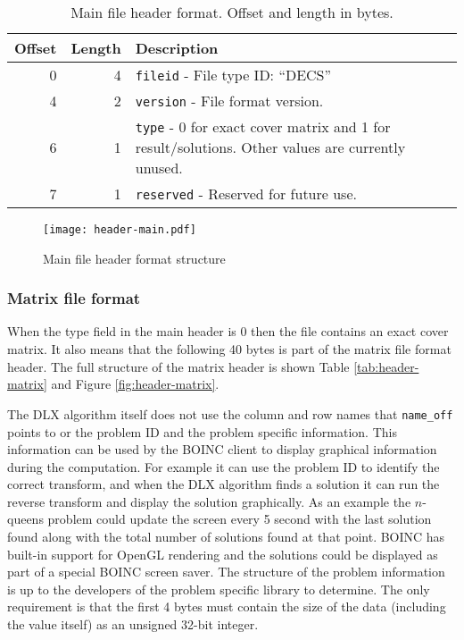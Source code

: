 
\begin{table}[htbp]
	\centering
	\begin{tabular}{|r|r|p{3.2in}|}
		\hline
		\bf Offset & \bf Length & \bf Description \\ \hline
		0  & 4 & \texttt{fileid} - File type ID: ``DECS'' \\ \hline
		4  & 2 & \texttt{version} - File format version. \\ \hline
		6  & 1 & \texttt{type} - 0 for exact cover matrix and 1 for result/solutions. Other values are currently unused. \\ \hline
		7  & 1 & \texttt{reserved} - Reserved for future use. \\ \hline
	\end{tabular}
	\caption{Main file header format. Offset and length in bytes.}
	\label{tab:header-main}
\end{table}

\begin{figure}[htbp]
	\centering
	\texttt{[image: header-main.pdf]}
	\caption{Main file header format structure}
	\label{fig:header-main}
\end{figure}


\subsubsection{Matrix file format}

When the type field in the main header is 0 then the file contains an exact cover matrix.
It also means that the following 40 bytes is part of the matrix file format header.
The full structure of the matrix header is shown Table \ref{tab:header-matrix} and Figure \ref{fig:header-matrix}.

The DLX algorithm itself does not use the column and row names that \texttt{name\_off} points to or the problem ID and the problem specific information.
This information can be used by the BOINC client to display graphical information during the computation.
For example it can use the problem ID to identify the correct transform, and when the DLX algorithm finds a solution it can run the reverse transform and display the solution graphically.
As an example the $n$-queens problem could update the screen every 5 second with the last solution found along with the total number of solutions found at that point.
BOINC has built-in support for OpenGL rendering and the solutions could be displayed as part of a special BOINC screen saver.
The structure of the problem information is up to the developers of the problem specific library to determine.
The only requirement is that the first 4 bytes must contain the size of the data (including the value itself) as an unsigned 32-bit integer.

